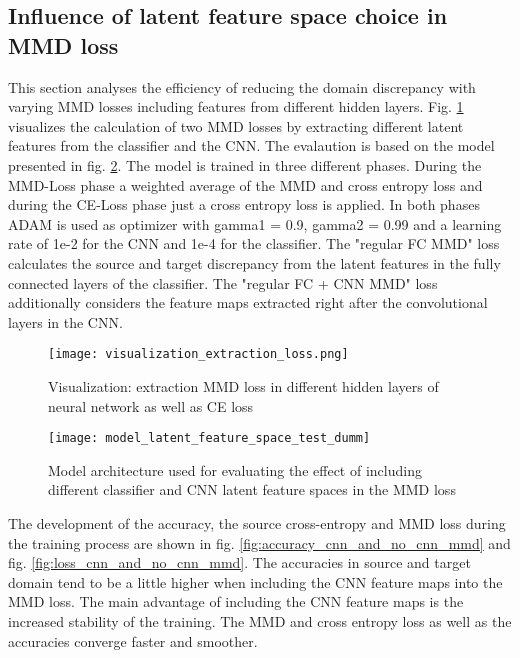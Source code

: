 \subsection{Influence of latent feature space choice in MMD loss}
This section analyses the efficiency of reducing the domain discrepancy with varying MMD losses including features from different hidden layers. Fig. \ref{fig:visualization_extraction_loss} visualizes the calculation of two MMD losses by extracting different latent features from the classifier and the CNN. The evalaution is based on the model presented in fig. \ref{fig:model_latent_feature_space_test_dumm}. The model is trained in three different phases. During the MMD-Loss phase a weighted average of the MMD and cross entropy loss and during the CE-Loss phase just a cross entropy loss is applied. In both phases ADAM is used as optimizer with gamma1 = 0.9, gamma2 = 0.99 and a learning rate of 1e-2 for the CNN and 1e-4 for the classifier. The "regular FC MMD" loss calculates the source and target discrepancy from the latent features in the fully connected layers of the classifier. The "regular FC + CNN MMD" loss additionally considers the feature maps extracted right after the convolutional layers in the CNN. 

\begin{figure}[htpb]
  \centering
  \texttt{[image: visualization\_extraction\_loss.png]}
  \caption {Visualization: extraction MMD loss in different hidden layers of neural network as well as CE loss} \label{fig:visualization_extraction_loss}
\end{figure}



\begin{figure}[htpb]
  \centering
  \texttt{[image: model\_latent\_feature\_space\_test\_dumm]}
  \caption {Model architecture used for evaluating the effect of including different classifier and CNN latent feature spaces in the MMD loss} \label{fig:model_latent_feature_space_test_dumm}
\end{figure}

The development of the accuracy, the source cross-entropy and MMD loss during the training process are shown in fig. \ref{fig:accuracy_cnn_and_no_cnn_mmd} and fig. \ref{fig:loss_cnn_and_no_cnn_mmd}. The accuracies in source and target domain tend to be a little higher when including the CNN feature maps into the MMD loss. The main advantage of including the CNN feature maps is the increased stability of the training. The MMD and cross entropy loss as well as the accuracies converge faster and smoother.






